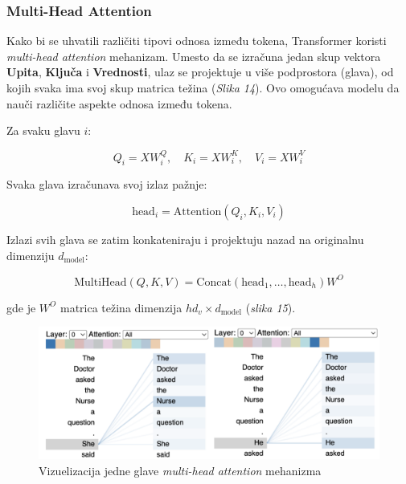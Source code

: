 \documentclass[12pt]{article}
\begin{document}
   \subsubsection*{Multi-Head Attention}
   Kako bi se uhvatili različiti tipovi odnosa između tokena, Transformer koristi 
   \textit{multi-head attention} mehanizam. Umesto da se izračuna jedan skup vektora 
   \textbf{Upita}, \textbf{Ključa} i \textbf{Vrednosti}, ulaz se projektuje u više 
   podprostora (glava), od kojih svaka ima svoj skup matrica težina (\textit{Slika 14}). Ovo omogućava modelu da 
   nauči različite aspekte odnosa između tokena.

   Za svaku glavu \( i \):

   \[
   Q_i = XW_i^Q, \quad K_i = XW_i^K, \quad V_i = XW_i^V
   \]

   Svaka glava izračunava svoj izlaz pažnje:

   \[
   \text{head}_i = \text{Attention}(Q_i, K_i, V_i)
   \]

   Izlazi svih glava se zatim konkateniraju i projektuju nazad na originalnu 
   dimenziju \( d_{\text{model}} \):

   \[
   \text{MultiHead}(Q, K, V) = \text{Concat}(\text{head}_1, \dots, \text{head}_h)W^O
   \]

   gde je \( W^O \) matrica težina dimenzija \( hd_v \times d_{\text{model}} \) (\textit{slika 15}).

   \begin{figure}[h!]
      \centering
      \vspace{0.5cm} %
      \includegraphics[width=1\textwidth]{attention_head.png}
      \caption{Vizuelizacija jedne glave \textit{multi-head attention} mehanizma \cite{attention_head}}
      \label{fig:attention_head}
   \end{figure}
\end{document}

